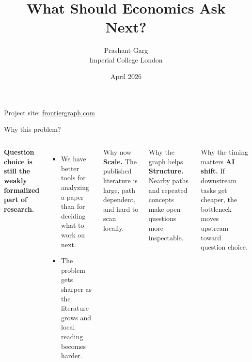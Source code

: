\documentclass[aspectratio=169,10pt]{beamer}
\title{What Should Economics Ask Next?}
\author{Prashant Garg \\ Imperial College London}
\date{April 2026}
\begin{document}
\begin{frame}[plain]
  \titlepage
  \vspace{-1.2em}
  \begin{center}
    {\small\color{DeckMuted}Project site: \href{https://frontiergraph.com}{\textcolor{DeckBlue}{frontiergraph.com}}}
  \end{center}
\end{frame}

\begin{frame}{Why this problem?}
\begin{columns}[T,totalwidth=0.95\textwidth]
\vspace{0.2em}
{\Large\bfseries
Question choice is still the weakly formalized part of research.
}

\vspace{0.85em}
{\small
\begin{itemize}
  \item We have better tools for analyzing a paper than for deciding what to work on next.
  \item The problem gets sharper as the literature grows and local reading becomes harder.
\end{itemize}
}

\begin{block}{Why now}
{\small
\textbf{Scale.} The published literature is large, path dependent, and hard to scan locally.
}
\end{block}

\vspace{0.45em}
\begin{block}{Why the graph helps}
{\small
\textbf{Structure.} Nearby paths and repeated concepts make open questions more inspectable.
}
\end{block}

\vspace{0.45em}
\begin{block}{Why the timing matters}
{\small
\textbf{AI shift.} If downstream tasks get cheaper, the bottleneck moves upstream toward question choice.
}
\end{block}
\end{columns}
\end{frame}
\end{document}
